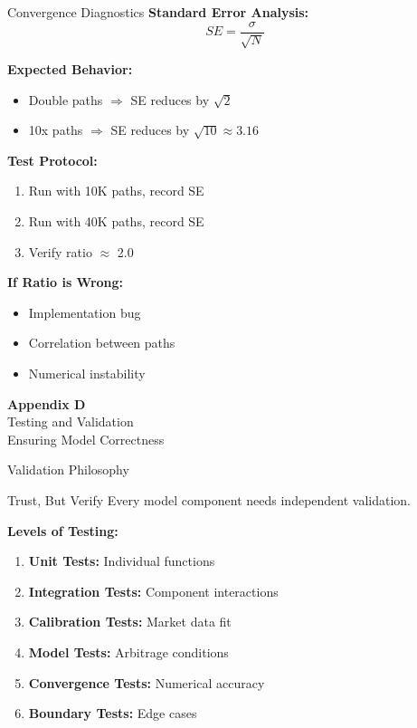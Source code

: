 \documentclass[aspectratio=169,11pt]{beamer}
\begin{document}
\begin{frame}{Convergence Diagnostics}
\textbf{Standard Error Analysis:}
\[
SE = \frac{\sigma}{\sqrt{N}}
\]

\textbf{Expected Behavior:}
\begin{itemize}
    \item Double paths $\Rightarrow$ SE reduces by $\sqrt{2}$
    \item 10x paths $\Rightarrow$ SE reduces by $\sqrt{10} \approx 3.16$
\end{itemize}

\textbf{Test Protocol:}
\begin{enumerate}
    \item Run with 10K paths, record SE
    \item Run with 40K paths, record SE
    \item Verify ratio $\approx$ 2.0
\end{enumerate}

\textbf{If Ratio is Wrong:}
\begin{itemize}
    \item Implementation bug
    \item Correlation between paths
    \item Numerical instability
\end{itemize}
\end{frame}


\begin{frame}{}
\begin{center}
\Huge\textbf{Appendix D}\\[1cm]
\Large Testing and Validation\\[0.5cm]
\normalsize Ensuring Model Correctness
\end{center}
\end{frame}

\begin{frame}{Validation Philosophy}
\begin{block}{Trust, But Verify}
Every model component needs independent validation.
\end{block}

\textbf{Levels of Testing:}
\begin{enumerate}
    \item \textbf{Unit Tests:} Individual functions
    \item \textbf{Integration Tests:} Component interactions
    \item \textbf{Calibration Tests:} Market data fit
    \item \textbf{Model Tests:} Arbitrage conditions
    \item \textbf{Convergence Tests:} Numerical accuracy
    \item \textbf{Boundary Tests:} Edge cases
\end{enumerate}
\end{frame}
\end{document}
